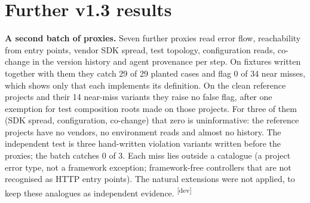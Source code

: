 \documentclass[10pt,a4paper]{article}
\newcommand{\devset}{\textsuperscript{\textsf{\tiny[dev]}}}
\begin{document}
\section{Further v1.3 results}

\textbf{A second batch of proxies.} Seven further proxies read error flow, reachability from entry points, vendor
SDK spread, test topology, configuration reads, co-change in the version history and agent provenance per step. On
fixtures written together with them they catch 29 of 29 planted cases and flag 0 of 34 near misses, which shows only
that each implements its definition. On the clean reference projects and their 14 near-miss variants they raise no
false flag, after one exemption for test composition roots made on those projects. For three of them (SDK spread,
configuration, co-change) that zero is uninformative: the reference projects have no vendors, no environment reads
and almost no history. The independent test is three hand-written violation variants written before the proxies;
the batch catches 0 of 3. Each miss lies outside a catalogue (a project error type, not a framework exception;
framework-free controllers that are not recognised as HTTP entry points). The natural extensions were not applied,
to keep these analogues as independent evidence. \devset{}
\end{document}
